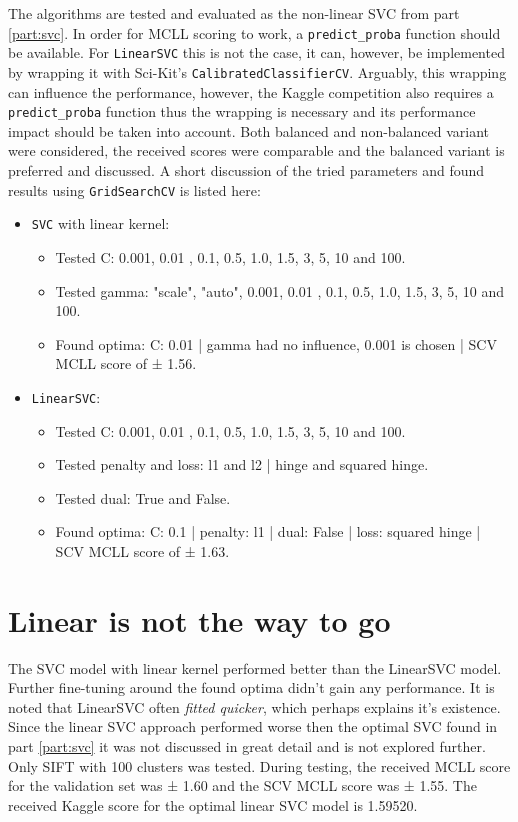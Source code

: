 The algorithms are tested and evaluated as the non-linear SVC from part \ref{part:svc}.
In order for MCLL scoring to work, a \texttt{predict\_proba} function should be available.
For \texttt{LinearSVC} this is not the case, it can, however, be implemented by wrapping it with Sci-Kit's \texttt{CalibratedClassifierCV}.
Arguably, this wrapping can influence the performance, however, the Kaggle competition also requires a \texttt{predict\_proba} function thus the wrapping is necessary and its performance impact should be taken into account.
Both balanced and non-balanced variant were considered, the received scores were comparable and the balanced variant is preferred and discussed.
A short discussion of the tried parameters and found results using \texttt{GridSearchCV} is listed here:
\begin{itemize}
    \item \texttt{SVC} with linear kernel:
    \begin{itemize}
        \item Tested C: 0.001, 0.01 , 0.1, 0.5, 1.0, 1.5, 3, 5, 10 and 100.
        \item Tested gamma: "scale", "auto", 0.001, 0.01 , 0.1, 0.5, 1.0, 1.5, 3, 5, 10 and 100.
        \item Found optima: C: 0.01 | gamma had no influence, 0.001 is chosen | SCV MCLL score of ± 1.56.
    \end{itemize}
    \item \texttt{LinearSVC}:
    \begin{itemize}
        \item Tested C: 0.001, 0.01 , 0.1, 0.5, 1.0, 1.5, 3, 5, 10 and 100.
        \item Tested penalty and loss: l1 and l2 | hinge and squared hinge.
        \item Tested dual: True and False.
        \item Found optima: C: 0.1 | penalty: l1 | dual: False | loss: squared hinge | SCV MCLL score of ± 1.63.
    \end{itemize}
\end{itemize}


\section{Linear is not the way to go}
\label{section:linsvc_optimal}

The SVC model with linear kernel performed better than the LinearSVC model.
Further fine-tuning around the found optima didn't gain any performance.
It is noted that LinearSVC often \textit{fitted quicker}, which perhaps explains it's existence.
Since the linear SVC approach performed worse then the optimal SVC found in part \ref{part:svc} it was not discussed in great detail and is not explored further.
Only SIFT with 100 clusters was tested.
During testing, the received MCLL score for the validation set was ± 1.60 and the SCV MCLL score was ± 1.55.
The received Kaggle score for the optimal linear SVC model is 1.59520.